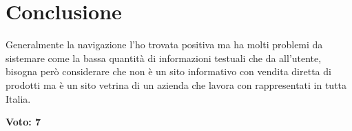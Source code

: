 \documentclass[../Relazione.tex]{subfiles}
\begin{document}
\section{Conclusione}
    Generalmente la navigazione l'ho trovata positiva ma ha molti problemi da sistemare come la bassa quantità di informazioni testuali che da all'utente, bisogna però considerare che non è un sito informativo con vendita diretta di prodotti ma è un sito vetrina di un azienda che lavora con rappresentati in tutta Italia.
    \begin{center}
        \textbf{Voto: 7}
    \end{center}
\end{document}

